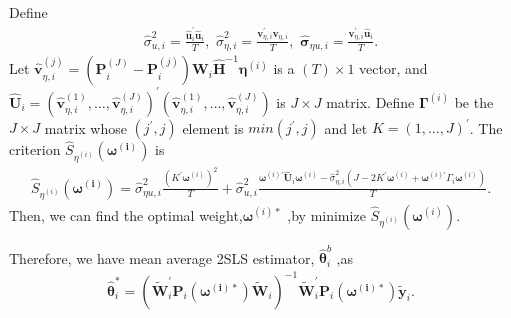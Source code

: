 \documentclass[12pt,a4paper,hyperref]{article}
\begin{document}
 Define
 \begin{align}
 \hat{\sigma}^{ 2}_{u, i}=\frac{\hat{\boldsymbol{u}}^{'}_{i} \hat{\boldsymbol{u}}_{i}}{T}, \,\, \hat{\sigma}^{2}_{\eta, i}=\frac{\boldsymbol{v}^{ '}_{\eta, i} \boldsymbol{v}_{\eta, i}}{T}, \,\, \hat{\boldsymbol{\sigma}}_{\eta u, i}=\frac{\boldsymbol{v}^{'}_{\eta, i} \hat{\boldsymbol{u}}_{i}}{T}.
 \end{align}
 Let $\hat{\boldsymbol{v}}^{(j)}_{\eta, i}=\left(\boldsymbol{P}_{i}^{(J)}- \boldsymbol{P}_{i}^{(j)}\right)\boldsymbol{W}_{i}  \hat{\boldsymbol{H}}^{-1}\boldsymbol{\eta}^{(i)}$ is a $(T) \times 1$ vector, and $\hat{\boldsymbol{U}}_{i}=\left(\hat{\boldsymbol{v}}^{(1)}_{\eta, i}, \ldots, \hat{\boldsymbol{v}}^{(J)}_{\eta, i} \right)^{'}\left(\hat{\boldsymbol{v}}^{(1)}_{\eta, i}, \ldots, \hat{\boldsymbol{v}}^{(J)}_{\eta, i} \right)$ is $J \times J$ matrix. Define $\boldsymbol{\Gamma}^{(i)}$ be the $J \times J$ matrix whose $(j^{'}, j)$ element is $min(j^{'}, j)$ and let $K=(1, \ldots, J)^{'}$. The criterion $\hat{S}_{\eta^{(i)}}\left(\boldsymbol{\omega^{(i)}} \right)$ is
 \begin{align}
 \hat{S}_{\eta^{(i)}}\left(\boldsymbol{\omega^{(i)}} \right)=\hat{\sigma}^{2}_{\eta u, i} \frac{(K^{'}\boldsymbol{\omega}^{(i)})^{2}}{T}+\hat{\sigma}^{2}_{u,i}\frac{\boldsymbol{\omega}^{(i)'}\hat{\boldsymbol{U}}_{i}\boldsymbol{\omega}^{(i)}-\hat{\sigma}^{ 2}_{\eta, i}(J-2K^{'}\boldsymbol{\omega}^{(i)}+\boldsymbol{\omega}^{(i)'}\Gamma_{i} \boldsymbol{\omega}^{(i)})}{T}.
 \end{align}
 Then, we can find the optimal weight,$\boldsymbol{\omega}^{(i)\ast}$ ,by minimize $\hat{S}_{\eta^{(i)}}(\boldsymbol{\omega}^{(i)})$.

















Therefore, we have mean average 2SLS estimator, $\hat{\boldsymbol{\theta}}^{b}_{i}$ ,as
\begin{align}
\hat{\boldsymbol{\theta}}^{\ast }_{i}= \left( \tilde{\boldsymbol{W}}^{'}_{i}\boldsymbol{P}_{i}\left(\boldsymbol{\omega^{(i)\ast}} \right)\tilde{\boldsymbol{W}}_{i} \right)^{-1} \tilde{\boldsymbol{W}}^{'}_{i}\boldsymbol{P}_{i}\left(\boldsymbol{\omega^{(i)\ast}} \right) \tilde{\boldsymbol{y}}_{i}.
\end{align}
\end{document}
